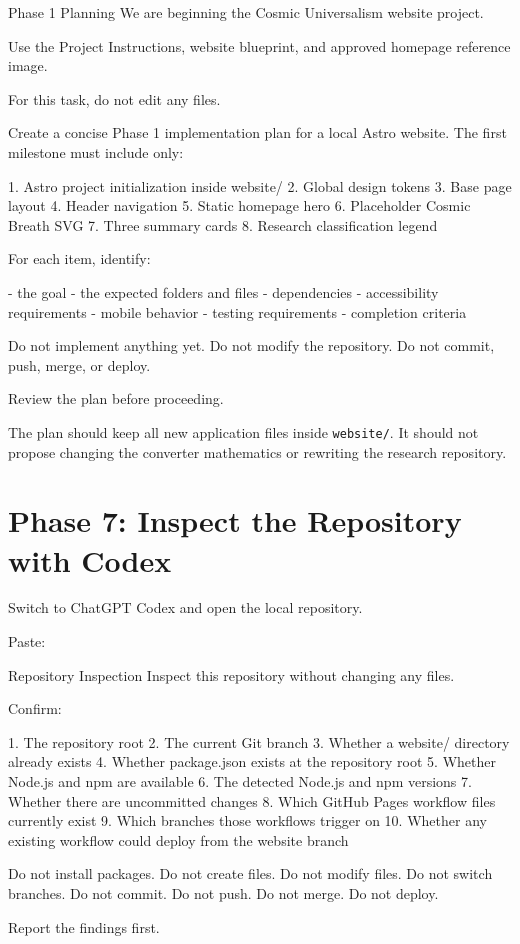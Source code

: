 \documentclass[11pt,letterpaper]{article}
\newcommand{\filepath}[1]{\texttt{#1}}
\begin{document}
\begin{promptbox}{Phase 1 Planning}
We are beginning the Cosmic Universalism website project.

Use the Project Instructions, website blueprint, and approved
homepage reference image.

For this task, do not edit any files.

Create a concise Phase 1 implementation plan for a local Astro
website. The first milestone must include only:

1. Astro project initialization inside website/
2. Global design tokens
3. Base page layout
4. Header navigation
5. Static homepage hero
6. Placeholder Cosmic Breath SVG
7. Three summary cards
8. Research classification legend

For each item, identify:

- the goal
- the expected folders and files
- dependencies
- accessibility requirements
- mobile behavior
- testing requirements
- completion criteria

Do not implement anything yet.
Do not modify the repository.
Do not commit, push, merge, or deploy.
\end{promptbox}

Review the plan before proceeding.

\begin{checkpointbox}
The plan should keep all new application files inside
\filepath{website/}. It should not propose changing the converter
mathematics or rewriting the research repository.
\end{checkpointbox}

\section{Phase 7: Inspect the Repository with Codex}

Switch to ChatGPT Codex and open the local repository.

Paste:

\begin{promptbox}{Repository Inspection}
Inspect this repository without changing any files.

Confirm:

1. The repository root
2. The current Git branch
3. Whether a website/ directory already exists
4. Whether package.json exists at the repository root
5. Whether Node.js and npm are available
6. The detected Node.js and npm versions
7. Whether there are uncommitted changes
8. Which GitHub Pages workflow files currently exist
9. Which branches those workflows trigger on
10. Whether any existing workflow could deploy from the
    website branch

Do not install packages.
Do not create files.
Do not modify files.
Do not switch branches.
Do not commit.
Do not push.
Do not merge.
Do not deploy.

Report the findings first.
\end{promptbox}
\end{document}

